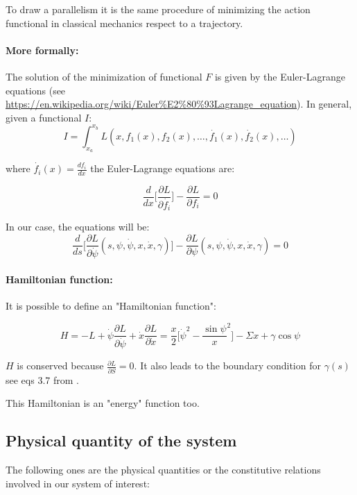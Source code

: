 \documentclass[12pt]{article}
\begin{document}
To draw a parallelism it is the same procedure of minimizing the action functional in classical mechanics respect to a trajectory.



\paragraph*{More formally:} 


The solution of the minimization of functional $F$ is given by the Euler-Lagrange equations (see \url{https://en.wikipedia.org/wiki/Euler%E2%80%93Lagrange_equation}). In general, given a functional $I$:
$$I=\int_{x_a}^{x_b}L(x,f_1(x),f_2(x),\dots,\dot{f_1}(x),\dot{f_2}(x),\dots)$$

where $\dot{f_i}(x)=\frac{df_i}{dx}$ the Euler-Lagrange equations are:

$$
\frac{d}{dx}\bigg[ \frac{\partial L}{\partial \dot{f_i}} \bigg] - \frac{\partial L}{\partial f_i} = 0
$$


In our case, the equations will be:
$$
\frac{d}{ds}\bigg[ \frac{\partial L}{\partial \dot{\psi}}(s,\psi,\dot{\psi},x,\dot{x},\gamma) \bigg] - \frac{\partial L}{\partial \psi}(s,\psi,\dot{\psi},x,\dot{x},\gamma) = 0
$$

\paragraph*{Hamiltonian function:}
It is possible to define an "Hamiltonian function":

\begin{equation*}
    H = -L + \dot{\psi} \frac{\partial L}{\partial \dot{\psi}} + \dot{x} \frac{\partial L}{\partial \dot{x}}
    = \frac{x}{2} \bigg[  \dot{\psi}^2 - \frac{\sin \psi}{x}^2 \bigg] - \Sigma x + \gamma \cos \psi
\end{equation*}

$H$ is conserved because $\frac{\partial L}{\partial S} = 0$. It also leads to the boundary condition for $\gamma(s)$ see eqs 3.7 from \cite{seifertShapeTransformationsVesicles1991}.

This Hamiltonian is an "energy" function too.



\subsection{Physical quantity of the system}
The following ones are the physical quantities or the constitutive relations involved in our system of interest:
\end{document}
